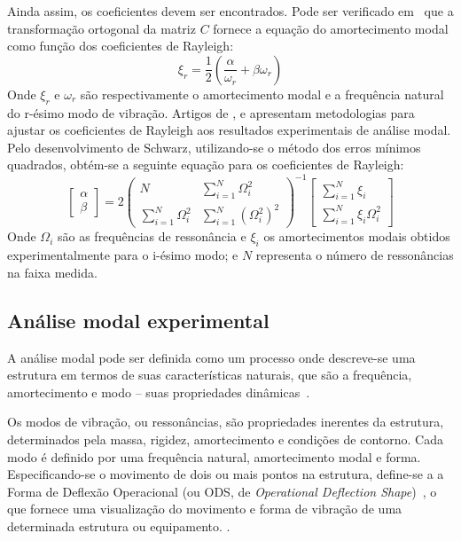 Ainda assim, os coeficientes devem ser encontrados. Pode ser verificado
em~\cite{craig2006fundamentals} que a transformação ortogonal da matriz $C$
fornece a equação do amortecimento modal como função dos coeficientes
de Rayleigh:
%
\begin{equation} \label{eq::xir}
	\xi_r = \frac{1}{2}\left(\frac{\alpha}{\omega_r} + \beta \omega_r\right )
\end{equation}
%
Onde $\xi_r$ e $\omega_r$ são respectivamente o amortecimento modal e a
frequência natural do r-ésimo modo de vibração. Artigos de
\citet{chen1996estimation}, \citet{adhikari2004rayleigh} e
\citet{schwarz2013proportional} apresentam metodologias para ajustar os
coeficientes de Rayleigh aos resultados experimentais de análise modal. Pelo
desenvolvimento de Schwarz, utilizando-se o método dos erros mínimos quadrados,
obtém-se a seguinte equação para os coeficientes de Rayleigh:
%
\begin{equation} \label{eq::brian}
	\begin{bmatrix}
	\alpha \\
	\beta
	\end{bmatrix}
= 2
	\begin{pmatrix}
	N & {\sum\limits_{i=1}^{N}\Omega_i^{2}} \\ 
	{\sum\limits_{i=1}^{N}\Omega_i^{2}} &
	{\sum\limits_{i=1}^{N}\left(\Omega_i^{2}\right)^2}
	\end{pmatrix}^{-1}
	\begin{bmatrix}
	\sum\limits_{i=1}^{N}\xi_i \\ 
	\sum\limits_{i=1}^{N}\xi_i \Omega_i^2
	\end{bmatrix}
\end{equation}
%
Onde $\Omega_i$ são as frequências de ressonância e $\xi_i$ os amortecimentos
modais obtidos experimentalmente para o i-ésimo modo; e $N$ representa o número
de ressonâncias na faixa medida.

\subsection{Análise modal experimental} \label{sec::modal_analysis}

A análise modal pode ser definida como um processo onde descreve-se uma
estrutura em termos de suas características naturais, que são a frequência,
amortecimento e modo -- suas propriedades
dinâmicas~\cite{avitabile2001experimental}.

Os modos de vibração, ou ressonâncias, são propriedades inerentes da estrutura,
determinados pela massa, rigidez, amortecimento e condições de contorno. Cada
modo é definido por uma frequência natural, amortecimento modal e forma.
Especificando-se o movimento de dois ou mais pontos na estrutura, define-se a a
Forma de Deflexão Operacional (ou ODS, de \textit{Operational Deflection
Shape})~\cite{schwarz1999experimental}, o que fornece uma visualização do
movimento e forma de vibração de uma determinada estrutura ou equipamento.
.

